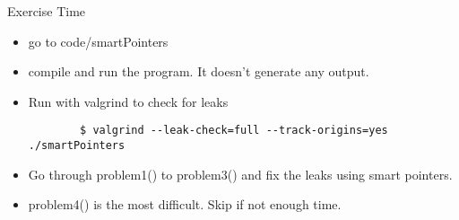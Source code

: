 \begin{frame}[fragile]
  \begin{alertblock}{Exercise Time}
    \begin{itemize}
    \item go to code/smartPointers
    \item compile and run the program. It doesn't generate any output.
    \item Run with valgrind to check for leaks
      { \scriptsize
      \begin{verbatim}
        $ valgrind --leak-check=full --track-origins=yes ./smartPointers
      \end{verbatim}
      }
    \item Go through {\ttfamily problem1()} to {\ttfamily problem3()} and fix the leaks using smart pointers.
    \item {\ttfamily problem4()} is the most difficult. Skip if not enough time.
    \end{itemize}
  \end{alertblock}
\end{frame}
